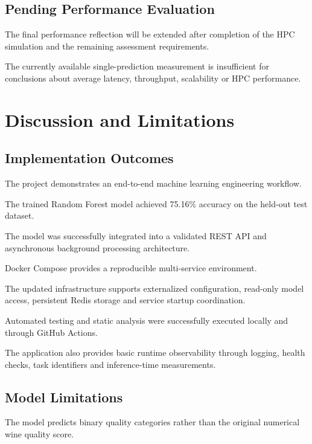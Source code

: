 \documentclass[11pt,a4paper]{article}
\begin{document}
\subsection{Pending Performance Evaluation}

The final performance reflection will be extended
after completion of the HPC simulation and the
remaining assessment requirements.

The currently available single-prediction
measurement is insufficient for conclusions
about average latency, throughput, scalability
or HPC performance.


\section{Discussion and Limitations}

\subsection{Implementation Outcomes}

The project demonstrates an end-to-end machine
learning engineering workflow.

The trained Random Forest model achieved 75.16\%
accuracy on the held-out test dataset.

The model was successfully integrated into a
validated REST API and asynchronous background
processing architecture.

Docker Compose provides a reproducible
multi-service environment.

The updated infrastructure supports externalized
configuration, read-only model access, persistent
Redis storage and service startup coordination.

Automated testing and static analysis were
successfully executed locally and through
GitHub Actions.

The application also provides basic runtime
observability through logging, health checks,
task identifiers and inference-time measurements.

\subsection{Model Limitations}

The model predicts binary quality categories
rather than the original numerical wine quality
score.
\end{document}
